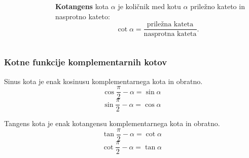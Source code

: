 \begin{frame}
\begin{columns}
\begin{figure}
                        \end{figure}
                        ~\\
                        ~\\
                        \textbf{Kotangens} kota $\alpha$ je količnik med kotu $\alpha$ priležno kateto in nasprotno kateto: $$\cot\alpha = \frac{\textrm{priležna kateta}}{\textrm{nasprotna kateta}}.$$
            \end{columns}

        \end{frame}


        \begin{frame}
            \frametitle{Kotne funkcije komplementarnih kotov}

            \begin{alertblock}{}
                Sinus kota je enak kosinusu komplementarnega kota in obratno.
                $$ \cos{\frac{\pi}{2}-\alpha} = \sin\alpha $$
                $$ \sin{\frac{\pi}{2}-\alpha} = \cos\alpha $$
            \end{alertblock}

            \begin{alertblock}{}
                Tangens kota je enak kotangensu komplementarnega kota in obratno.
                $$ \tan{\frac{\pi}{2}-\alpha} = \cot\alpha $$
                $$ \cot{\frac{\pi}{2}-\alpha} = \tan\alpha $$
            \end{alertblock}
        \end{frame}
        

